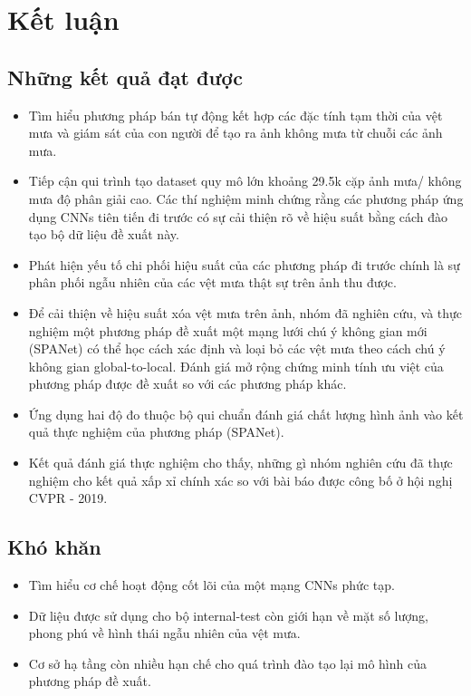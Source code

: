 \chapter{Kết luận}
\label{Chapter5}
\hspace{10mm}{Trong chương này chúng tôi sẽ tổng hợp lại những gì chúng tôi đã làm được đối với bài toán xóa vệt mưa trên ảnh.}
\section{Những kết quả đạt được}
\begin{itemize}
    \item Tìm hiểu phương pháp bán tự động kết hợp các đặc tính tạm thời của vệt mưa và giám sát của con người để tạo ra ảnh không mưa từ chuỗi các ảnh mưa.
    \item Tiếp cận qui trình tạo dataset quy mô lớn khoảng 29.5k cặp ảnh mưa/ không mưa độ phân giải cao. Các thí nghiệm minh chứng rằng các phương pháp ứng dụng CNNs tiên tiến đi trước có sự cải thiện rõ về hiệu suất bằng cách đào tạo bộ dữ liệu đề xuất này.
    \item Phát hiện yếu tố chi phối hiệu suất của các phương pháp đi trước chính là sự phân phối ngẫu nhiên của các vệt mưa thật sự trên ảnh thu được.
    \item Để cải thiện về hiệu suất xóa vệt mưa trên ảnh, nhóm đã nghiên cứu, và thực nghiệm một phương pháp đề xuất một mạng lưới chú ý không gian mới (SPANet) có thể học cách xác định và loại bỏ các vệt mưa theo cách chú ý không gian global-to-local. Đánh giá mở rộng chứng minh tính ưu việt của phương pháp được đề xuất so với các phương pháp khác.
    \item Ứng dụng hai độ đo thuộc bộ qui chuẩn đánh giá chất lượng hình ảnh vào kết quả thực nghiệm của phương pháp (SPANet).
    \item Kết quả đánh giá thực nghiệm cho thấy,  những gì nhóm nghiên cứu đã thực nghiệm cho kết quả xấp xỉ chính xác so với bài báo được công bố ở hội nghị CVPR - 2019.
\end{itemize}
\section{Khó khăn}
\begin{itemize}
    \item Tìm hiểu cơ chế hoạt động cốt lõi của một mạng CNNs phức tạp.
    \item Dữ liệu được sử dụng cho bộ internal-test còn giới hạn về mặt số lượng, phong phú về hình thái ngẫu nhiên của vệt mưa.
    \item Cơ sở hạ tầng còn nhiều hạn chế cho quá trình đào tạo lại mô hình của phương pháp đề xuất.
\end{itemize}

